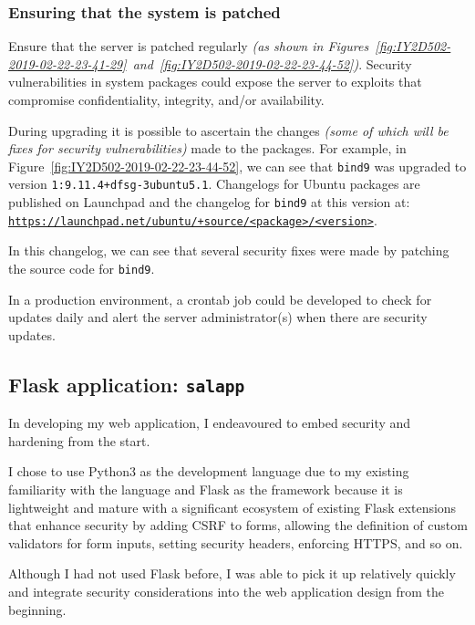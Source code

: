 \pagebreak
\subsubsection{Ensuring that the system is patched}
Ensure that the server is patched regularly \textit{(as shown in Figures~\ref{fig:IY2D502-2019-02-22-23-41-29}~and~\ref{fig:IY2D502-2019-02-22-23-44-52})}. Security vulnerabilities in system packages could expose the server to exploits that compromise confidentiality, integrity, and/or availability.

During upgrading it is possible to ascertain the changes \textit{(some of which will be fixes for security vulnerabilities)} made to the packages. For example, in Figure~\ref{fig:IY2D502-2019-02-22-23-44-52}, we can see that \texttt{bind9} was upgraded to version \texttt{1:9.11.4+dfsg-3ubuntu5.1}. Changelogs for Ubuntu packages are published on Launchpad and the changelog for \texttt{bind9} at this version at:\\
\href{https://launchpad.net/ubuntu/+source/bind9/1:9.11.4+dfsg-3ubuntu5.1}{\texttt{https://launchpad.net/ubuntu/+source/<package>/<version>}}.

In this changelog, we can see that several security fixes were made by patching the source code for \texttt{bind9}.

In a production environment, a crontab job could be developed to check for updates daily and alert the server administrator(s) when there are security updates.

\pagebreak
\subsection{Flask application: \texttt{salapp}}
In developing my web application, I endeavoured to embed security and hardening from the start.

I chose to use Python3 as the development language due to my existing familiarity with the language and Flask as the framework because it is lightweight and mature with a significant ecosystem of existing Flask extensions that enhance security by adding CSRF to forms, allowing the definition of custom validators for form inputs, setting security headers, enforcing HTTPS, and so on.

Although I had not used Flask before, I was able to pick it up relatively quickly and integrate security considerations into the web application design from the beginning.

